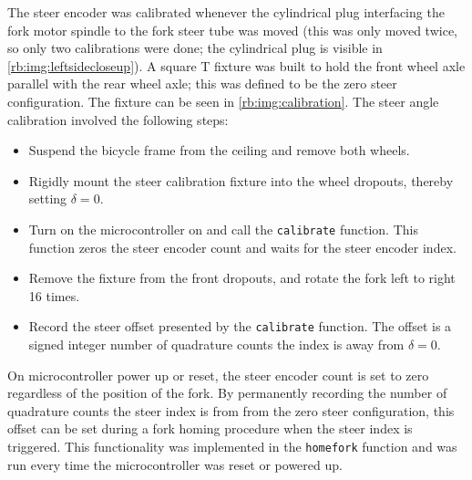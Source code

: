 The steer encoder was calibrated whenever the cylindrical plug interfacing the
fork motor spindle to the fork steer tube was moved (this was only moved twice,
so only two calibrations were done; the cylindrical plug is visible in
\autoref{rb:img:leftsidecloseup}). A square T fixture was built to hold the
front wheel axle parallel with the rear wheel axle; this was defined to be the
zero steer configuration. The fixture can be seen in
\autoref{rb:img:calibration}. The steer angle calibration involved the
following steps:
\begin{itemize}
  \item Suspend the bicycle frame from the ceiling and remove both wheels.
  \item Rigidly mount the steer calibration fixture into the wheel dropouts,
    thereby setting $\delta=0$.
  \item Turn on the microcontroller on and call the \verb|calibrate| function.
    This function zeros the steer encoder count and waits for the steer encoder
    index.
  \item Remove the fixture from the front dropouts, and rotate the fork left to
    right 16 times.
  \item Record the steer offset presented by the \verb|calibrate| function. The
    offset is a signed integer number of quadrature counts the index is away
    from $\delta=0$.
\end{itemize}
On microcontroller power up or reset, the steer encoder count is set to zero
regardless of the position of the fork. By permanently recording the number of
quadrature counts the steer index is from from the zero steer configuration,
this offset can be set during a fork homing procedure when the steer index is
triggered.  This functionality was implemented in the \verb|homefork| function
and was run every time the microcontroller was reset or powered up.

